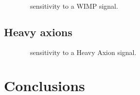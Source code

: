 			\begin{figure}
				\centering
				\caption{\MJ~\minmod~sensitivity to a WIMP signal.}
				\label{fig:MJSensitivityToWIMP}
			\end{figure}		
			
		\subsection{Heavy axions}
		\label{sec:MJSensitivityToAxions}
		
			\begin{figure}
				\centering
				\caption{\MJ~\minmod~sensitivity to a Heavy Axion signal.}
				\label{fig:MJSensitivityToHeavyAxions}
			\end{figure}		
			
		

	\section{Conclusions}
	\label{sec:OtherLowEnergyConclusions}	